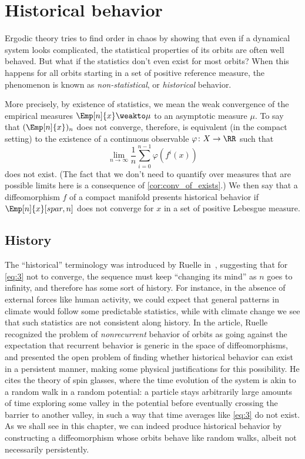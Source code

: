 \documentclass[../main]{subfiles}
\begin{document}
\chapter{Historical behavior}\label{cha:historical-behavior}

Ergodic theory tries to find order in chaos by showing that even if a dynamical system looks complicated, the statistical properties of its orbits are often well behaved. But what if the statistics don't even exist for most orbits? When this happens for all orbits starting in a set of positive reference measure, the phenomenon is known as \emph{non-statistical}, or \emph{historical} behavior.

More precisely, by existence of statistics, we mean the weak convergence of the empirical measures \(\Emp[n]{x} \weakto \mu\) to an asymptotic measure \(\mu\). To say that \((\Emp[n]{x})_n\) does not converge, therefore, is equivalent (in the compact setting) to the existence of a continuous observable \(\varphi \colon X \to \RR\) such that
\begin{equation}\label{eq:3}
  \lim_{n \to \infty} \frac{1}{n}\sum_{i = 0}^{n - 1} \varphi(f^i(x))
\end{equation}
does not exist. (The fact that we don't need to quantify over measures that are possible limits here is a consequence of \cref{cor:conv_of_exists}.) We then say that a diffeomorphism \(f\) of a compact manifold presents historical behavior if \(\Emp[n]{x}[spar, n]\) does not converge for \(x\) in a set of positive Lebesgue measure.

\section{History}
The ``historical'' terminology was introduced by Ruelle in~\cite{ruelleHistoricalBehaviourSmooth2001}, suggesting that for \cref{eq:3} not to converge, the sequence must keep ``changing its mind'' as \(n\) goes to infinity, and therefore has some sort of history. For instance, in the absence of external forces like human activity, we could expect that general patterns in climate would follow some predictable statistics, while with climate change we see that such statistics are not consistent along history. In the article, Ruelle recognized the problem of \textit{nonrecurrent} behavior of orbits as going against the expectation that recurrent behavior is generic in the space of diffeomorphisms, and presented the open problem of finding whether historical behavior can exist in a persistent manner, making some physical justifications for this possibility. He cites the theory of spin glasses, where the time evolution of the system is akin to a random walk in a random potential: a particle stays arbitrarily large amounts of time exploring some valley in the potential before eventually crossing the barrier to another valley, in such a way that time averages like \cref{eq:3} do not exist. As we shall see in this chapter, we can indeed produce historical behavior by constructing a diffeomorphism whose orbits behave like random walks, albeit not necessarily persistently.
\end{document}

